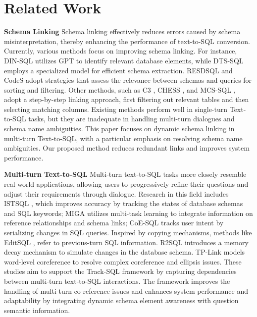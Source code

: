 \documentclass[11pt]{article}
\begin{document}
\section{Related Work}
\noindent\textbf{Schema Linking} 
Schema linking effectively reduces errors caused by schema misinterpretation, thereby enhancing the performance of text-to-SQL conversion. Currently, various methods focus on improving schema linking. For instance, DIN-SQL \cite{li2024can} utilizes GPT to identify relevant database elements, while DTS-SQL \cite{pourreza2024dtssqldecomposedtexttosqlsmall} employs a specialized model for efficient schema extraction. RESDSQL \cite{li2023resdsql} and CodeS \cite{li2024codesbuildingopensourcelanguage} adopt strategies that assess the relevance between schemas and queries for sorting and filtering. Other methods, such as C3 \cite{dong2023c3zeroshottexttosqlchatgpt}, CHESS \cite{talaei2024chesscontextualharnessingefficient}, and MCS-SQL \cite{lee2024mcssqlleveragingmultipleprompts}, adopt a step-by-step linking approach, first filtering out relevant tables and then selecting matching columns. Existing methods perform well in single-turn Text-to-SQL tasks, but they are inadequate in handling multi-turn dialogues and schema name ambiguities. This paper focuses on dynamic schema linking in multi-turn Text-to-SQL, with a particular emphasis on resolving schema name ambiguities. Our proposed method reduces redundant links and improves system performance.

\vspace{4pt}
\noindent\textbf{Multi-turn Text-to-SQL }
Multi-turn text-to-SQL tasks more closely resemble real-world applications, allowing users to progressively refine their questions and adjust their requirements through dialogue. Research in this field includes ISTSQL \cite{wang2021tracking}, which improves accuracy by tracking the states of database schemas and SQL keywords; MIGA \cite{fu2023miga} utilizes multi-task learning to integrate information on reference relationships and schema links; CoE-SQL \cite{zhang-etal-2024-coe} tracks user intent by serializing changes in SQL queries. Inspired by copying mechanisms, methods like EditSQL \cite{zhang-etal-2019-editing}, refer to previous-turn SQL information. R2SQL \cite{hui2021dynamic} introduces a memory decay mechanism to simulate changes in the database schema. TP-Link \cite{liu-etal-2024-tp} models word-level coreference to resolve complex coreference and ellipsis issues. These studies aim to support the Track-SQL framework by capturing dependencies between multi-turn text-to-SQL interactions. The framework improves the handling of multi-turn co-reference issues and enhances system performance and adaptability by integrating dynamic schema element awareness with question semantic information.
\end{document}
